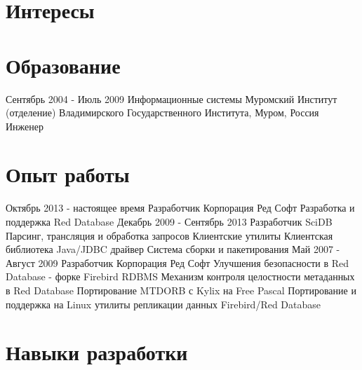 \documentclass[11pt,a4paper]{moderncv}
\begin{document}
\maketitle

\section{Интересы}
  
\section{Образование}
\cventry
  {Сентябрь 2004 - Июль 2009}
  {Информационные системы}
  {Муромский Институт (отделение) Владимирского Государственного Института, Муром, Россия}
  {}{}
  {Инженер}

\section{Опыт работы}
\cventry
  {Октябрь 2013 - настоящее время}
  {Разработчик}
  {Корпорация Ред Софт}
  {}{}
  {
    Разработка и поддержка Red Database
  }
\cventry
  {Декабрь 2009 - Сентябрь 2013}
  {Разработчик}
  {SciDB}
  {}{}
  {Парсинг, трансляция и обработка запросов\newline{}
   Клиентские утилиты\newline{}
   Клиентская библиотека\newline{}
   Java/JDBC драйвер\newline{}
   Система сборки и пакетирования}
\cventry
  {Май 2007 - Август 2009}
  {Разработчик}
  {Корпорация Ред Софт}
  {}{}
  {
    Улучшения безопасности в Red Database - форке Firebird RDBMS\newline{}
    Механизм контроля целостности метаданных в Red Database\newline{}
    Портирование MTDORB с Kylix на Free Pascal\newline{}
    Портирование и поддержка на Linux утилиты репликации данных Firebird/Red Database
  }

\section{Навыки разработки}
\end{document}
